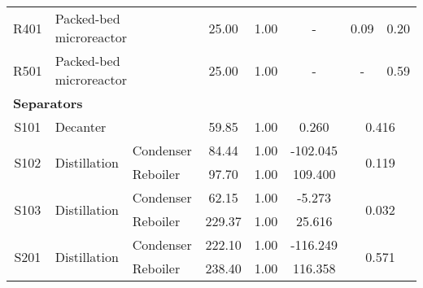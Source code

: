 \begin{table}[H]
\begin{tabular}{cllccccccc}
R401                  & \multicolumn{2}{l}{Packed-bed microreactor}        & \multicolumn{2}{c}{25.00}                     & 1.00                    & \multicolumn{2}{c}{-}                       & 0.09                         & 0.20        \\
R501                  & \multicolumn{2}{l}{Packed-bed microreactor}        & \multicolumn{2}{c}{25.00}                     & 1.00                    & \multicolumn{2}{c}{-}                       & -                            & 0.59        \\ \cmidrule{1-10}
\multicolumn{10}{l}{\textbf{Separators}}                                                                                                                                                                                                        \\
S101                  & \multicolumn{2}{l}{Decanter}                       & \multicolumn{2}{c}{59.85}                     & 1.00                    & \multicolumn{2}{c}{0.260}                   & \multicolumn{2}{c}{0.416}                  \\
\multirow{2}{*}{S102} & \multirow{2}{*}{Distillation}      & Condenser     & \multicolumn{2}{c}{84.44}                     & 1.00                    & \multicolumn{2}{c}{-102.045}                & \multicolumn{2}{c}{\multirow{2}{*}{0.119}} \\
                      &                                    & Reboiler      & \multicolumn{2}{c}{97.70}                     & 1.00                    & \multicolumn{2}{c}{109.400}                 & \multicolumn{2}{c}{}         \\
\multirow{2}{*}{S103} & \multirow{2}{*}{Distillation}      & Condenser     & \multicolumn{2}{c}{62.15}                     & 1.00                    & \multicolumn{2}{c}{-5.273}                  & \multicolumn{2}{c}{\multirow{2}{*}{0.032}} \\
                      &                                    & Reboiler      & \multicolumn{2}{c}{229.37}                    & 1.00                    & \multicolumn{2}{c}{25.616}                  & \multicolumn{2}{c}{}         \\
\multirow{2}{*}{S201} & \multirow{2}{*}{Distillation}      & Condenser     & \multicolumn{2}{c}{222.10}                    & 1.00                    & \multicolumn{2}{c}{-116.249}                & \multicolumn{2}{c}{\multirow{2}{*}{0.571}} \\
                      &                                    & Reboiler      & \multicolumn{2}{c}{238.40}                    & 1.00                    & \multicolumn{2}{c}{116.358}                 & \multicolumn{2}{c}{}         \\

\end{tabular}
\end{table}
